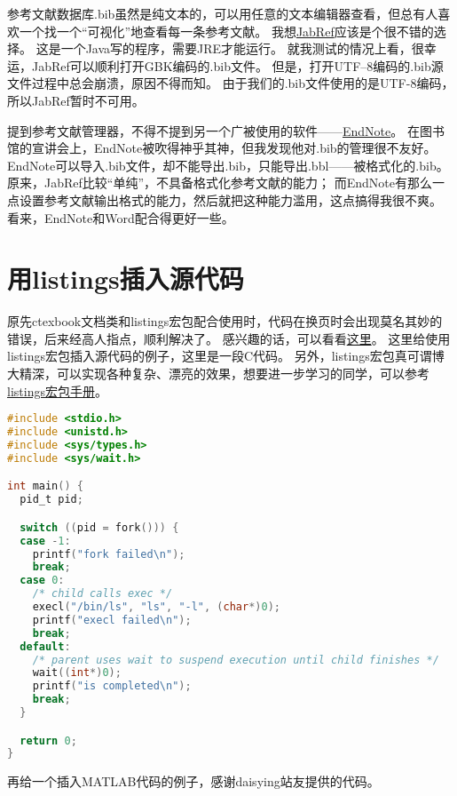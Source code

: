 参考文献数据库.bib虽然是纯文本的，可以用任意的文本编辑器查看，但总有人喜欢一个找一个``可视化''地查看每一条参考文献。
我想\href{http://jabref.sourceforge.net/}{JabRef}应该是个很不错的选择。
这是一个Java写的程序，需要JRE才能运行。
就我测试的情况上看，很幸运，JabRef可以顺利打开GBK编码的.bib文件。
但是，打开UTF--8编码的.bib源文件过程中总会崩溃，原因不得而知。
由于我们的.bib文件使用的是UTF-8编码，所以JabRef暂时不可用。

提到参考文献管理器，不得不提到另一个广被使用的软件——\href{http://www.endnote.com/}{EndNote}。
在图书馆的宣讲会上，EndNote被吹得神乎其神，但我发现他对.bib的管理很不友好。
EndNote可以导入.bib文件，却不能导出.bib，只能导出.bbl——被格式化的.bib。
原来，JabRef比较``单纯''，不具备格式化参考文献的能力；
而EndNote有那么一点设置参考文献输出格式的能力，然后就把这种能力滥用，这点搞得我很不爽。
看来，EndNote和Word配合得更好一些。


\section{用listings插入源代码}

原先ctexbook文档类和listings宏包配合使用时，代码在换页时会出现莫名其妙的错误，后来经高人指点，顺利解决了。
感兴趣的话，可以看看\href{http://bbs.ctex.org/viewthread.php?tid=53451}{这里}。
这里给使用listings宏包插入源代码的例子，这里是一段C代码。
另外，listings宏包真可谓博大精深，可以实现各种复杂、漂亮的效果，想要进一步学习的同学，可以参考
\href{http://mirror.ctan.org/macros/latex/contrib/listings/listings.pdf}{listings宏包手册}。

\begin{lstlisting}[language={C}, caption={一段C源代码}]
#include <stdio.h>
#include <unistd.h>
#include <sys/types.h>
#include <sys/wait.h>

int main() {
  pid_t pid;

  switch ((pid = fork())) {
  case -1:
    printf("fork failed\n");
    break;
  case 0:
    /* child calls exec */
    execl("/bin/ls", "ls", "-l", (char*)0);
    printf("execl failed\n");
    break;
  default:
    /* parent uses wait to suspend execution until child finishes */
    wait((int*)0);
    printf("is completed\n");
    break;
  }

  return 0;
}
\end{lstlisting}

再给一个插入MATLAB代码的例子，感谢daisying站友提供的代码。

